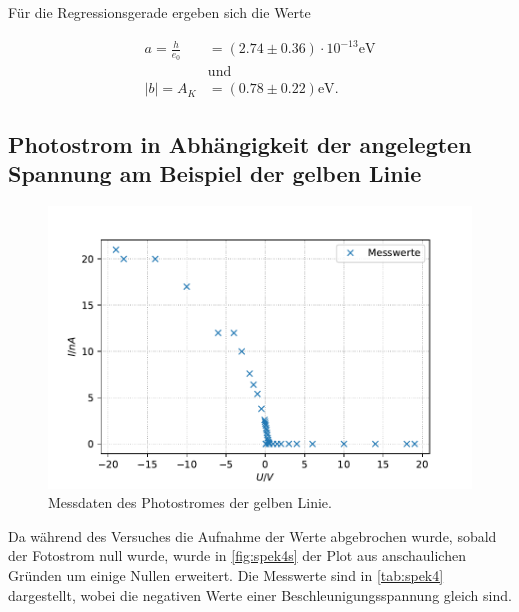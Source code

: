Für die Regressionsgerade ergeben sich die Werte

\begin{align}
  a = \frac{h}{e_0} &= (2.74 ± 0.36) \cdot 10^{-13} \unit{\eV} \\
  &\text{und} \\
  |b| = A_K &= (0.78 ±  0.22) \unit{\eV}.
\end{align}

\subsection{Photostrom in Abhängigkeit der angelegten Spannung am Beispiel der gelben Linie}
\begin{figure}
  \center
  \caption{Messdaten des Photostromes der gelben Linie.}\label{fig:spek4s}
  \includegraphics[width=0.8\linewidth]{pictures/spek4s.pdf}
\end{figure}

Da während des Versuches die Aufnahme der Werte abgebrochen wurde, sobald der Fotostrom null wurde,
wurde in \autoref{fig:spek4s} der Plot aus anschaulichen Gründen um einige Nullen erweitert.
Die Messwerte sind in \autoref{tab:spek4} dargestellt, wobei die negativen Werte einer Beschleunigungsspannung gleich sind.